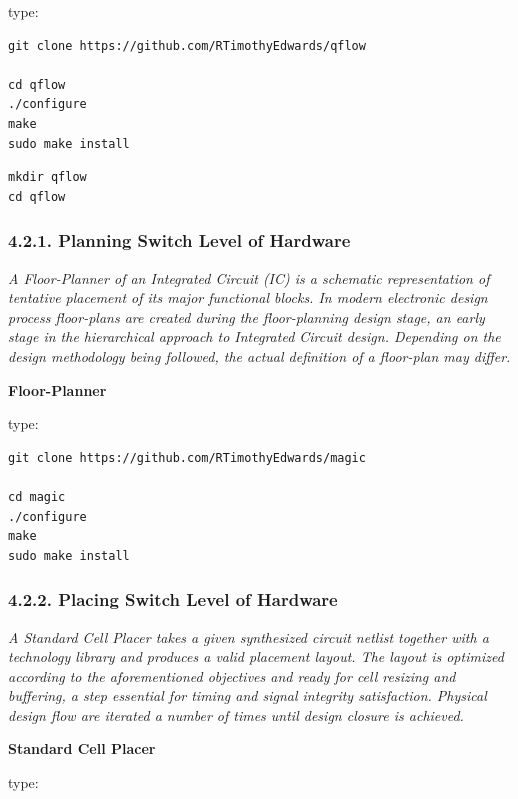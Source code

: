 \documentclass[
]{article}
\begin{document}
type:

\begin{verbatim}
git clone https://github.com/RTimothyEdwards/qflow

cd qflow
./configure
make
sudo make install
\end{verbatim}

\begin{verbatim}
mkdir qflow
cd qflow
\end{verbatim}

\hypertarget{planning-switch-level-of-hardware}{%
\subsubsection{4.2.1. Planning Switch Level of
Hardware}\label{planning-switch-level-of-hardware}}

\emph{A Floor-Planner of an Integrated Circuit (IC) is a schematic
representation of tentative placement of its major functional blocks. In
modern electronic design process floor-plans are created during the
floor-planning design stage, an early stage in the hierarchical approach
to Integrated Circuit design. Depending on the design methodology being
followed, the actual definition of a floor-plan may differ.}

\textbf{Floor-Planner}

type:

\begin{verbatim}
git clone https://github.com/RTimothyEdwards/magic

cd magic
./configure
make
sudo make install
\end{verbatim}

\hypertarget{placing-switch-level-of-hardware}{%
\subsubsection{4.2.2. Placing Switch Level of
Hardware}\label{placing-switch-level-of-hardware}}

\emph{A Standard Cell Placer takes a given synthesized circuit netlist
together with a technology library and produces a valid placement
layout. The layout is optimized according to the aforementioned
objectives and ready for cell resizing and buffering, a step essential
for timing and signal integrity satisfaction. Physical design flow are
iterated a number of times until design closure is achieved.}

\textbf{Standard Cell Placer}

type:
\end{document}
